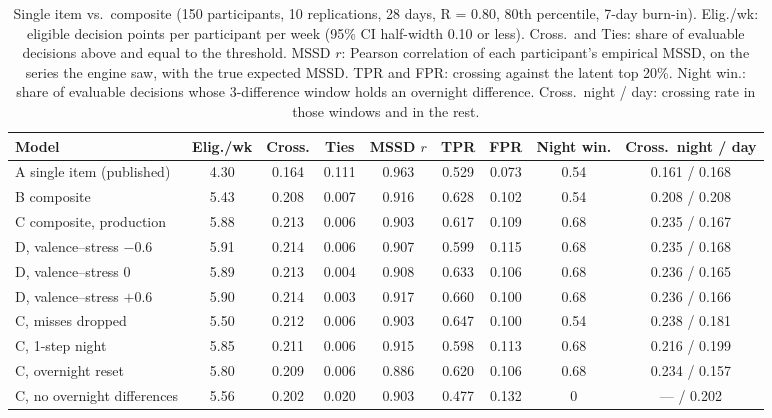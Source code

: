\documentclass[11pt,letterpaper]{article}
\begin{document}
\begin{table}[htbp]
\centering
\scriptsize
\setlength{\tabcolsep}{3pt}
\begin{tabular}{@{}lcccccccc@{}}
\toprule
\textbf{Model} & \textbf{Elig./wk} & \textbf{Cross.} & \textbf{Ties} & \textbf{MSSD $r$} & \textbf{TPR} & \textbf{FPR} & \textbf{Night win.} & \textbf{Cross.\ night / day} \\
\midrule
A single item (published) & 4.30 & 0.164 & 0.111 & 0.963 & 0.529 & 0.073 & 0.54 & 0.161 / 0.168 \\
B composite & 5.43 & 0.208 & 0.007 & 0.916 & 0.628 & 0.102 & 0.54 & 0.208 / 0.208 \\
C composite, production & 5.88 & 0.213 & 0.006 & 0.903 & 0.617 & 0.109 & 0.68 & 0.235 / 0.167 \\
D, valence--stress $-0.6$ & 5.91 & 0.214 & 0.006 & 0.907 & 0.599 & 0.115 & 0.68 & 0.235 / 0.168 \\
D, valence--stress $0$ & 5.89 & 0.213 & 0.004 & 0.908 & 0.633 & 0.106 & 0.68 & 0.236 / 0.165 \\
D, valence--stress $+0.6$ & 5.90 & 0.214 & 0.003 & 0.917 & 0.660 & 0.100 & 0.68 & 0.236 / 0.166 \\
C, misses dropped & 5.50 & 0.212 & 0.006 & 0.903 & 0.647 & 0.100 & 0.54 & 0.238 / 0.181 \\
C, 1-step night & 5.85 & 0.211 & 0.006 & 0.915 & 0.598 & 0.113 & 0.68 & 0.216 / 0.199 \\
C, overnight reset & 5.80 & 0.209 & 0.006 & 0.886 & 0.620 & 0.106 & 0.68 & 0.234 / 0.157 \\
C, no overnight differences & 5.56 & 0.202 & 0.020 & 0.903 & 0.477 & 0.132 & 0 & --- / 0.202 \\
\bottomrule
\end{tabular}
\caption{Single item vs.\ composite (150 participants, 10 replications, 28 days, R = 0.80, 80th percentile, 7-day burn-in). Elig./wk: eligible decision points per participant per week (95\% CI half-width 0.10 or less). Cross.\ and Ties: share of evaluable decisions above and equal to the threshold. MSSD $r$: Pearson correlation of each participant's empirical MSSD, on the series the engine saw, with the true expected MSSD. TPR and FPR: crossing against the latent top 20\%. Night win.: share of evaluable decisions whose 3-difference window holds an overnight difference. Cross.\ night / day: crossing rate in those windows and in the rest.}
\label{tab:composite}
\end{table}
\end{document}
